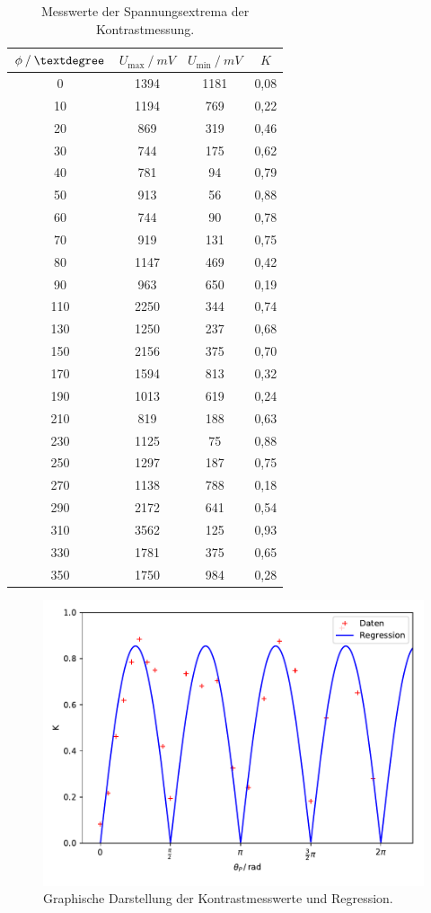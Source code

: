 \begin{table}[H]
\centering
\begin{tabular}{c|c|c|c}
{$\phi \:/\: \textdegree$} & {$U_\text{max} \:/\: \si{mV}$} & {$U_\text{min} \:/\: \si{mV}$} & {$K$}\\
\midrule
0 & 1394 & 1181 & 0,08 \\
10 & 1194 & 769 & 0,22 \\
20 & 869 & 319 & 0,46 \\
30 & 744 & 175 & 0,62 \\
40 & 781 & 94 & 0,79 \\
50 & 913 & 56 & 0,88 \\
60 & 744 & 90 & 0,78 \\
70 & 919 & 131 & 0,75 \\
80 & 1147 & 469 & 0,42 \\
90 & 963 & 650 & 0,19 \\
110 & 2250 & 344 & 0,74 \\
130 & 1250 & 237 & 0,68 \\
150 & 2156 & 375 & 0,70 \\
170 & 1594 & 813 & 0,32 \\
190 & 1013 & 619 & 0,24 \\
210 & 819 & 188 & 0,63 \\
230 & 1125 & 75 & 0,88 \\
250 & 1297 & 187 & 0,75 \\
270 & 1138 & 788 & 0,18 \\
290 & 2172 & 641 & 0,54 \\
310 & 3562 & 125 & 0,93 \\
330 & 1781 & 375 & 0,65 \\
350 & 1750 & 984 & 0,28 \\
\end{tabular}
\caption{Messwerte der Spannungsextrema der Kontrastmessung.}
\label{tab:kontrast}
\end{table}
\begin{figure}[H]
  \centering
  \includegraphics[scale=0.9]{bilder/kontrastplot.pdf}
  \caption{Graphische Darstellung der Kontrastmesswerte und Regression.}
  \label{fig:kontrastplot}
\end{figure}

